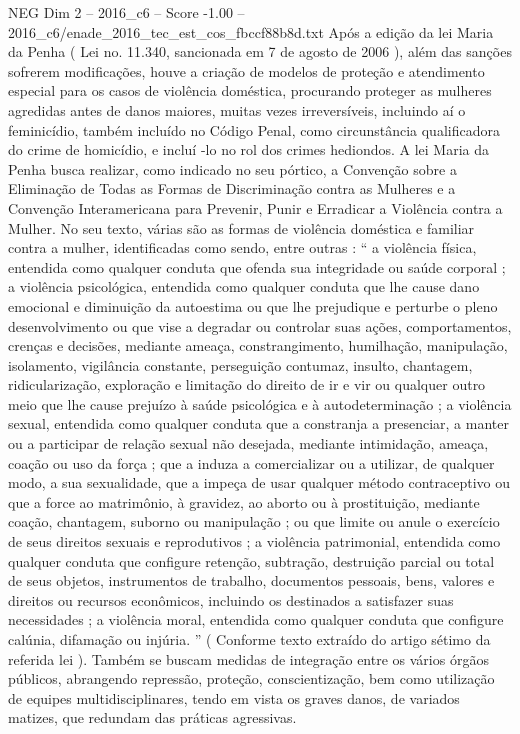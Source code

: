 \begin{textsample}{NEG Dim 2 – 2016\_c6 – Score -1.00 – 2016\_c6/enade\_2016\_tec\_est\_cos\_fbccf88b8d.txt}
Após a edição da lei Maria da Penha ( Lei no. 11.340, sancionada em 7 de agosto de 2006 ), além das sanções sofrerem modificações, houve a criação de modelos de proteção e atendimento especial para os casos de violência doméstica, procurando proteger as mulheres agredidas antes de danos maiores, muitas vezes irreversíveis, incluindo aí o feminicídio, também incluído no Código Penal, como circunstância qualificadora do crime de homicídio, e incluí -lo no rol dos crimes hediondos.
A lei Maria da Penha busca realizar, como indicado no seu pórtico, a Convenção sobre a Eliminação de Todas as Formas de Discriminação contra as Mulheres e a Convenção Interamericana para Prevenir, Punir e Erradicar a Violência contra a Mulher.
No seu texto, várias são as formas de violência doméstica e familiar contra a mulher, identificadas como sendo, entre outras : “ a violência física, entendida como qualquer conduta que ofenda sua integridade ou saúde corporal ; a violência psicológica, entendida como qualquer conduta que lhe cause dano emocional e diminuição da autoestima ou que lhe prejudique e perturbe o pleno desenvolvimento ou que vise a degradar ou controlar suas ações, comportamentos, crenças e decisões, mediante ameaça, constrangimento, humilhação, manipulação, isolamento, vigilância constante, perseguição contumaz, insulto, chantagem, ridicularização, exploração e limitação do direito de ir e vir ou qualquer outro meio que lhe cause prejuízo à saúde psicológica e à autodeterminação ; a violência sexual, entendida como qualquer conduta que a constranja a presenciar, a manter ou a participar de relação sexual não desejada, mediante intimidação, ameaça, coação ou uso da força ; que a induza a comercializar ou a utilizar, de qualquer modo, a sua sexualidade, que a impeça de usar qualquer método contraceptivo ou que a force ao matrimônio, à gravidez, ao aborto ou à prostituição, mediante coação, chantagem, suborno ou manipulação ; ou que limite ou anule o exercício de seus direitos sexuais e reprodutivos ; a violência patrimonial, entendida como qualquer conduta que configure retenção, subtração, destruição parcial ou total de seus objetos, instrumentos de trabalho, documentos pessoais, bens, valores e direitos ou recursos econômicos, incluindo os destinados a satisfazer suas necessidades ; a violência moral, entendida como qualquer conduta que configure calúnia, difamação ou injúria. ” ( Conforme texto extraído do artigo sétimo da referida lei ).
Também se buscam medidas de integração entre os vários órgãos públicos, abrangendo repressão, proteção, conscientização, bem como utilização de equipes multidisciplinares, tendo em vista os graves danos, de variados matizes, que redundam das práticas agressivas.

\end{textsample}
